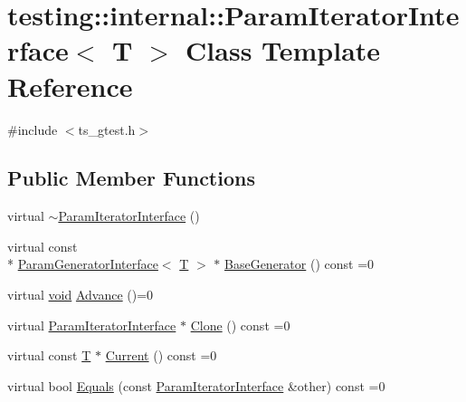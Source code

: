 \hypertarget{classtesting_1_1internal_1_1ParamIteratorInterface}{\section{testing\-:\-:internal\-:\-:Param\-Iterator\-Interface$<$ T $>$ Class Template Reference}
\label{classtesting_1_1internal_1_1ParamIteratorInterface}
}


{\ttfamily \#include $<$ts\-\_\-gtest.\-h$>$}

\subsection*{Public Member Functions}
\begin{DoxyCompactItemize}
\item 
virtual \hyperlink{classtesting_1_1internal_1_1ParamIteratorInterface_adf6ba49e6b54a6e3b15dbd5733988bef}{$\sim$\-Param\-Iterator\-Interface} ()
\item 
virtual const \\*
\hyperlink{classtesting_1_1internal_1_1ParamGeneratorInterface}{Param\-Generator\-Interface}$<$ \hyperlink{calib3d_8hpp_a3efb9551a871ddd0463079a808916717}{T} $>$ $\ast$ \hyperlink{classtesting_1_1internal_1_1ParamIteratorInterface_a17500953df75ecda1ace46c08ff731e9}{Base\-Generator} () const =0
\item 
virtual \hyperlink{legacy_8hpp_a8bb47f092d473522721002c86c13b94e}{void} \hyperlink{classtesting_1_1internal_1_1ParamIteratorInterface_a600dbd35fcb551463e379516a1abea48}{Advance} ()=0
\item 
virtual \hyperlink{classtesting_1_1internal_1_1ParamIteratorInterface}{Param\-Iterator\-Interface} $\ast$ \hyperlink{classtesting_1_1internal_1_1ParamIteratorInterface_a4998c23e27e2943d97546011aa35db80}{Clone} () const =0
\item 
virtual const \hyperlink{calib3d_8hpp_a3efb9551a871ddd0463079a808916717}{T} $\ast$ \hyperlink{classtesting_1_1internal_1_1ParamIteratorInterface_adfff808576d929085679c315b255af7e}{Current} () const =0
\item 
virtual bool \hyperlink{classtesting_1_1internal_1_1ParamIteratorInterface_a9d811697a752d46f7bd6a0082f9040a3}{Equals} (const \hyperlink{classtesting_1_1internal_1_1ParamIteratorInterface}{Param\-Iterator\-Interface} \&other) const =0
\end{DoxyCompactItemize}



